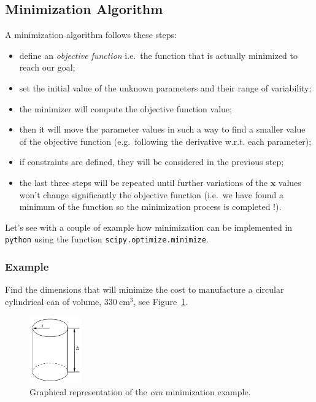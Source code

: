 \subsection{Minimization Algorithm}\label{minimization-algorithm}

A minimization algorithm follows these steps:

\begin{itemize}
\tightlist
\item
  define an \emph{objective function} i.e.~the function that is actually
  minimized to reach our goal;
\item
  set the initial value of the unknown parameters and their range of
  variability;
\item
  the minimizer will compute the objective function value;
\item
  then it will move the parameter values in such a way to find a smaller
  value of the objective function (e.g.~following the derivative w.r.t.
  each parameter);
\item if constraints are defined, they will be considered in the previous step;
\item
  the last three steps will be repeated until further variations of the
  \(\mathbf{x}\) values won't change significantly the objective
  function (i.e.~we have found a minimum of the function so the
  minimization process is completed !).
\end{itemize}

Let's see with a couple of example how minimization can be implemented in \texttt{python} using the function \texttt{scipy.optimize.minimize}.

\subsubsection{Example}\label{example}

Find the dimensions that will minimize the cost to
manufacture a circular cylindrical can of volume, \(330~\mathrm{cm}^3\), see Figure~\ref{fig:cylinder}.

\begin{figure}[h]
\centering
\includegraphics[width=0.2\textwidth]{cylinder.png}
\caption{Graphical representation of the \emph{can} minimization example.}
\label{fig:cylinder}
\end{figure}

